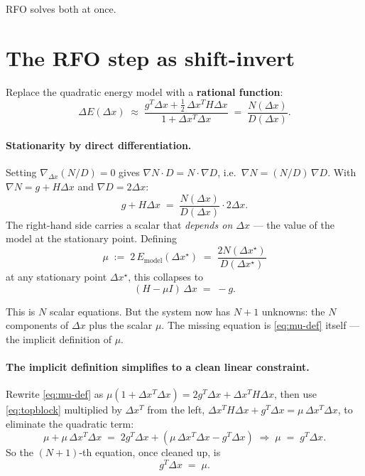 \documentclass[11pt]{article}
\newcommand{\dx}{\Delta x}
\begin{document}
RFO solves both at once.

\section{The RFO step as shift-invert}

Replace the quadratic energy model with a \textbf{rational function}:
\begin{equation*}
  \Delta E(\dx) \;\approx\;
    \frac{g^T \dx + \tfrac{1}{2}\, \dx^T H \dx}{1 + \dx^T \dx}
  \;=\; \frac{N(\dx)}{D(\dx)}.
\end{equation*}

\paragraph{Stationarity by direct differentiation.}
Setting $\nabla_{\dx}(N/D) = 0$ gives $\nabla N \cdot D = N \cdot \nabla D$,
i.e.\ $\nabla N = (N/D)\, \nabla D$.  With $\nabla N = g + H\dx$ and
$\nabla D = 2\dx$:
\begin{equation*}
  g + H\dx \;=\; \frac{N(\dx)}{D(\dx)} \cdot 2\dx.
\end{equation*}
The right-hand side carries a scalar that \emph{depends on $\dx$} --- the
value of the model at the stationary point.  Defining
\begin{equation}\label{eq:mu-def}
  \mu \;:=\; 2\, E_{\text{model}}(\dx^\star) \;=\; \frac{2 N(\dx^\star)}{D(\dx^\star)}
\end{equation}
at any stationary point $\dx^\star$, this collapses to
\begin{equation}\label{eq:topblock}
  (H - \mu I)\, \dx \;=\; -g.
\end{equation}

This is $N$ scalar equations.  But the system now has $N+1$ unknowns: the
$N$ components of $\dx$ plus the scalar $\mu$.  The missing equation is
\eqref{eq:mu-def} itself --- the implicit definition of $\mu$.

\paragraph{The implicit definition simplifies to a clean linear constraint.}
Rewrite \eqref{eq:mu-def} as
$\mu(1 + \dx^T\dx) = 2 g^T\dx + \dx^T H \dx$, then use \eqref{eq:topblock}
multiplied by $\dx^T$ from the left, $\dx^T H \dx + g^T \dx = \mu\, \dx^T \dx$,
to eliminate the quadratic term:
\begin{equation*}
  \mu + \mu\, \dx^T \dx \;=\; 2 g^T \dx + (\mu\, \dx^T \dx - g^T \dx)
  \;\Longrightarrow\;
  \mu \;=\; g^T \dx.
\end{equation*}
So the $(N{+}1)$-th equation, once cleaned up, is
\begin{equation}\label{eq:bottomblock}
  g^T \dx \;=\; \mu.
\end{equation}
\end{document}
